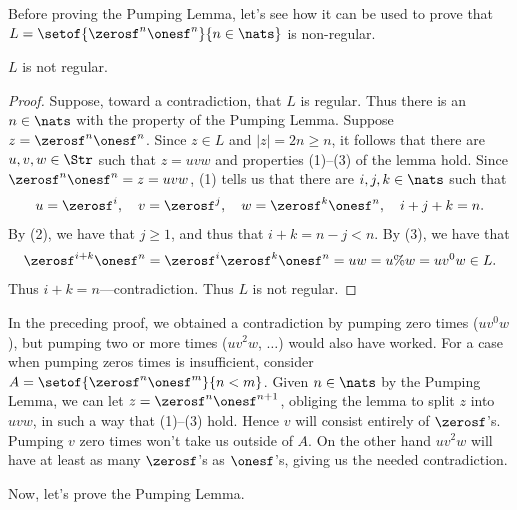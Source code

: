 Before proving the Pumping Lemma, let's see how it can be used to
prove that $L=\setof{\zerosf^n\onesf^n}{n\in\nats}$ is non-regular.

\begin{proposition}
\label{NonRegularProp1}
$L$ is not regular.
\end{proposition}

\begin{proof}
Suppose, toward a contradiction, that $L$ is regular.
Thus there is an $n\in\nats$ with the property of the Pumping Lemma.
Suppose $z=\zerosf^n\onesf^n$.  Since $z\in L$ and
$|z|=2n\geq n$, it follows that there are $u,v,w\in\Str$ such that
$z=uvw$ and properties (1)--(3) of the lemma hold.  Since
$\zerosf^n\onesf^n=z=uvw$, (1) tells us that
there are $i,j,k\in\nats$ such that
\begin{gather*}
u=\zerosf^i,\quad
v=\zerosf^j,\quad
w=\zerosf^k\onesf^n,\quad
i+j+k=n .
\end{gather*}
By (2), we have that
$j\geq 1$, and thus that $i+k = n - j < n$.  By
(3), we have that
\begin{gather*}
\zerosf^{i+k}\onesf^n=\zerosf^i\zerosf^k\onesf^n=uw=u\%w=uv^0w\in L .
\end{gather*}
Thus $i+k=n$---contradiction.  Thus $L$ is not regular.
\end{proof}

In the preceding proof, we obtained a contradiction by pumping zero
times ($uv^0w$), but pumping two or more times ($uv^2w$, $\ldots$) would
also have worked.  For a case when pumping zeros times is
insufficient, consider $A=\setof{\zerosf^n\onesf^m}{n<m}$.  Given
$n\in\nats$ by the Pumping Lemma, we can let
$z=\zerosf^n\onesf^{n+1}$, obliging the lemma to split $z$ into $uvw$,
in such a way that (1)--(3) hold.  Hence $v$ will consist entirely of
$\zerosf$'s.  Pumping $v$ zero times won't take us outside of $A$.  On
the other hand $uv^2w$ will have at least as many $\zerosf$'s as
$\onesf$'s, giving us the needed contradiction.

Now, let's prove the Pumping Lemma.

